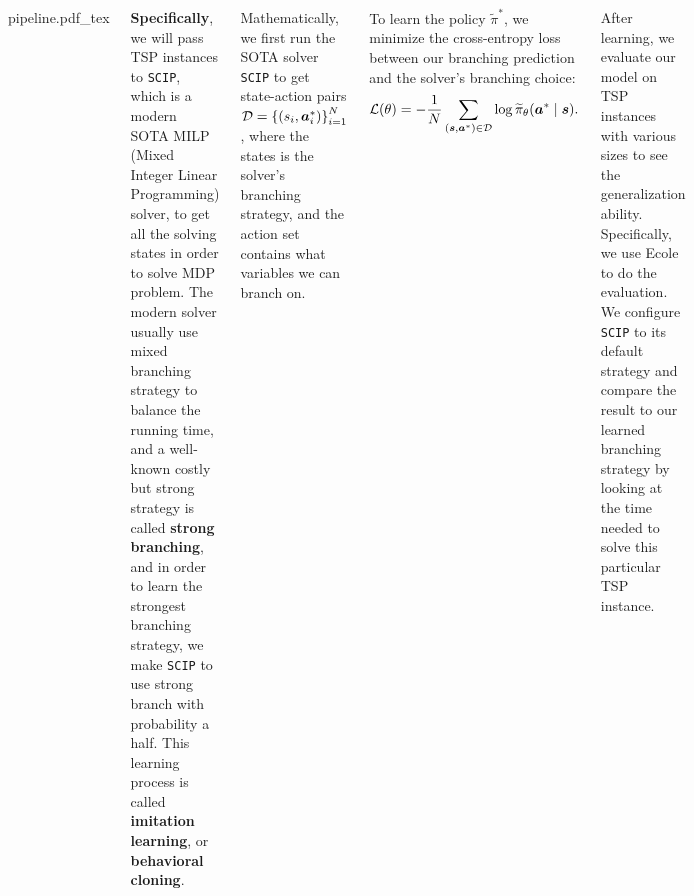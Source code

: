 \documentclass[20pt,,margin=1in,innermargin=-4.5in,blockverticalspace=-0.25in]{tikzposter}
\newcommand{\incfig}[1]{%
	\def\svgwidth{0.35\columnwidth}
	{#1.pdf_tex}
}
\begin{document}
\begin{columns}
{	\begin{tikzfigure}
		\centering
		\incfig{pipeline}
	\end{tikzfigure}
	\textbf{Specifically}, we will pass TSP instances to \texttt{SCIP}, which is a modern SOTA MILP (Mixed Integer Linear Programming) solver, to get all
	the solving states in order to solve MDP problem. The modern solver usually use mixed branching strategy to balance the running
	time, and a well-known costly but strong strategy is called \textbf{strong branching}, and in order to learn the strongest branching strategy, we make
	\texttt{SCIP} to use strong branch with probability a half. This learning process is called \textbf{imitation learning}, or \textbf{behavioral
		cloning}\cite{Efficient-Training-of-artificial-Neural-Networks-for-Autonomous-Navigation}.

	Mathematically, we first run the SOTA solver \texttt{SCIP} to get state-action pairs \(\mathcal{\MakeUppercase{d}} = \left\{(s_{i} , \bm{a} _{i} ^\ast)\right\}_{i = 1}^N\),
	where the states is the solver's branching strategy, and the action set contains what variables we can branch on.


	To learn the policy \(\widetilde{\pi} ^\ast\), we minimize the cross-entropy loss between our branching prediction and the solver's branching choice:
	\[
		\mathcal{\MakeUppercase{l}} (\theta ) = - \frac{1}{N}\sum\limits_{(\bm{s}, \bm{a}^\ast)\in \mathcal{\MakeUppercase{d}} }\log \widetilde{\pi}_\theta (\bm{a} ^\ast \mid \bm{s} ).
	\]

	After learning, we evaluate our model on TSP instances with various sizes to see the generalization ability. Specifically, we use
	Ecole\cite{prouvost2020ecole} to do the evaluation. We configure \texttt{SCIP} to its default strategy and compare the result to our learned branching
	strategy by looking at the time needed to solve this particular TSP instance.
	}



\end{columns}
\end{document}
